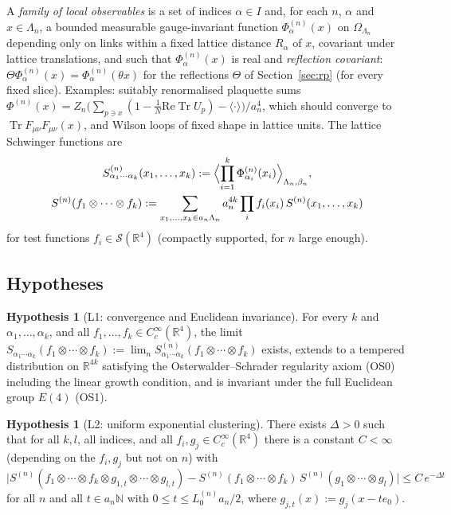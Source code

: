 \documentclass[11pt,a4paper]{article}
\theoremstyle{definition}
\newtheorem{hypothesis}[theorem]{Hypothesis}
\theoremstyle{remark}
\DeclareMathOperator{\Tr}{Tr}
\newcommand{\R}{\mathbb{R}}
\newcommand{\N}{\mathbb{N}}
\begin{document}
A \emph{family of local observables} is a set of indices $\alpha\in I$ and, for each $n$, $\alpha$ and
$x\in\Lambda_n$, a bounded measurable gauge-invariant function $\Phi^{(n)}_\alpha(x)$ on $\Omega_{\Lambda_n}$ depending only on
links within a fixed lattice distance $R_\alpha$ of $x$, covariant under lattice translations, and such that
$\Phi^{(n)}_\alpha(x)$ is real and \emph{reflection covariant}: $\Theta\Phi^{(n)}_\alpha(x)=\Phi^{(n)}_\alpha(\theta x)$ for
the reflections $\Theta$ of Section~\ref{sec:rp} (for every fixed slice). Examples: suitably renormalised plaquette
sums $\Phi^{(n)}(x)=Z_n\bigl(\sum_{p\ni x}(1-\tfrac1N\mathrm{Re}\Tr U_p)-\langle\cdot\rangle\bigr)/a_n^4$, which should
converge to $\Tr F_{\mu\nu}F_{\mu\nu}(x)$, and Wilson loops of fixed shape in lattice units. The lattice Schwinger
functions are
\begin{gather*}
S^{(n)}_{\alpha_1\cdots\alpha_k}(x_1,\dots,x_k):=\Bigl\langle\prod_{i=1}^k\Phi^{(n)}_{\alpha_i}(x_i)\Bigr\rangle_{\Lambda_n,\beta_n},\\
S^{(n)}(f_1\otimes\cdots\otimes f_k):=\sum_{x_1,\dots,x_k\in a_n\Lambda_n}a_n^{4k}\prod_if_i(x_i)\,S^{(n)}(x_1,\dots,x_k)
\end{gather*}
for test functions $f_i\in\mathcal S(\R^4)$ (compactly supported, for $n$ large enough).

\subsection{Hypotheses}

\begin{hypothesis}[L1: convergence and Euclidean invariance]\label{hyp:L1}
For every $k$ and $\alpha_1,\dots,\alpha_k$, and all $f_1,\dots,f_k\in C_c^\infty(\R^4)$, the limit
$S_{\alpha_1\cdots\alpha_k}(f_1\otimes\cdots\otimes f_k):=\lim_nS^{(n)}_{\alpha_1\cdots\alpha_k}(f_1\otimes\cdots\otimes f_k)$
exists, extends to a tempered distribution on $\R^{4k}$ satisfying the Osterwalder--Schrader regularity axiom (OS0)
including the linear growth condition, and is invariant under the full Euclidean group $E(4)$ (OS1).
\end{hypothesis}

\begin{hypothesis}[L2: uniform exponential clustering]\label{hyp:L2}
There exists $\Delta>0$ such that for all $k,l$, all indices, and all $f_i,g_j\in C_c^\infty(\R^4)$ there is a constant
$C<\infty$ (depending on the $f_i,g_j$ but not on $n$) with
\[
\bigl|S^{(n)}(f_1\otimes\cdots\otimes f_k\otimes g_{1,t}\otimes\cdots\otimes g_{l,t})
-S^{(n)}(f_1\otimes\cdots\otimes f_k)\,S^{(n)}(g_1\otimes\cdots\otimes g_l)\bigr|\le C\,e^{-\Delta t}
\]
for all $n$ and all $t\in a_n\N$ with $0\le t\le L^{(n)}_0a_n/2$, where $g_{j,t}(x):=g_j(x-te_0)$.
\end{hypothesis}
\end{document}
